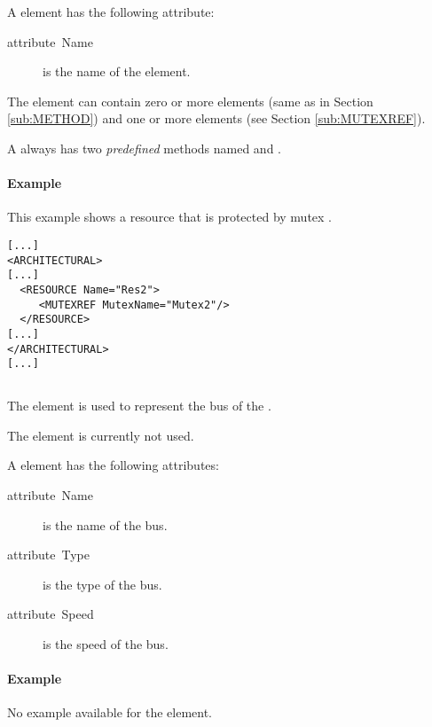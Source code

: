 A  element has the following attribute:

\begin{description}
\item [{attribute~Name}] is the name of the  element.
\end{description}

The  element can contain zero or more 
elements (same as in Section \ref{sub:METHOD}) and one or more
 elements (see Section \ref{sub:MUTEXREF}).

A  always has two \emph{predefined} methods named
 and .


\paragraph{Example}

This example shows a resource  that is protected by mutex
.

\begin{lstlisting}
[...]
<ARCHITECTURAL>
[...]
  <RESOURCE Name="Res2">
     <MUTEXREF MutexName="Mutex2"/>
  </RESOURCE> 
[...]
</ARCHITECTURAL>
[...]
\end{lstlisting}


\subsection{}

The  element is used to represent the bus of the
.

The  element is currently not used.

A  element has the following attributes:
\begin{description}
\item [{attribute~Name}] is the name of the bus.
\item [{attribute~Type}] is the type of the bus.
\item [{attribute~Speed}] is the speed of the bus.
\end{description}

\paragraph{Example}

No example available for the  element.


\subsection{}

